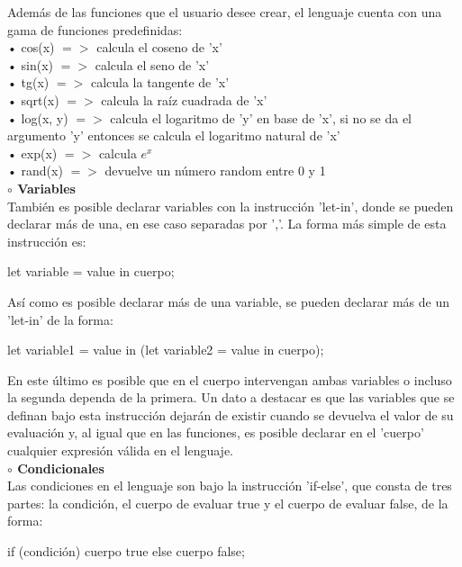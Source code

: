 \documentclass[letterpaper]{article}
\begin{document}
{Además de las funciones que el usuario desee crear, el lenguaje cuenta con una gama de funciones predefinidas: \\
• cos(x) $=>$ calcula el coseno de 'x' \\
• sin(x) $=>$ calcula el seno de 'x' \\
• tg(x) $=>$ calcula la tangente de 'x' \\
• sqrt(x) $=>$ calcula la raíz cuadrada de 'x' \\
• log(x, y) $=>$ calcula el logaritmo de 'y' en base de 'x', si no se da el argumento 'y' entonces se calcula el logaritmo natural de 'x'  \\
• exp(x) $=>$ calcula $e ^ x$ \\
• rand(x) $=>$ devuelve un número random entre 0 y 1 \\


\textbf{{\large $\circ $ Variables}}\\

También es posible declarar variables con la instrucción 'let-in', donde se pueden declarar más de una, en ese caso separadas por ','. La forma más
simple de esta instrucción es: 

\begin{center}
	let variable = value in cuerpo;
\end{center}

Así como es posible declarar más de una variable, se pueden declarar más de un 'let-in' de la forma:

\begin{center}
	let variable1 = value in (let variable2 = value in cuerpo);
\end{center}

En este último es posible que en el cuerpo intervengan ambas variables o incluso la segunda dependa de la primera.
Un dato a destacar es que las variables que se definan bajo esta instrucción dejarán de existir cuando se devuelva 
el valor de su evaluación y, al igual que en las funciones, es posible declarar en el 'cuerpo' cualquier expresión
válida en el lenguaje. \\

\textbf{{\large $\circ $ Condicionales}} \\

Las condiciones en el lenguaje son bajo la instrucción 'if-else', que consta de tres partes: la condición, el cuerpo 
de evaluar true y el cuerpo de evaluar false, de la forma:

\begin{center}
	if (condición) cuerpo true else cuerpo false;
\end{center}

}
\end{document}
